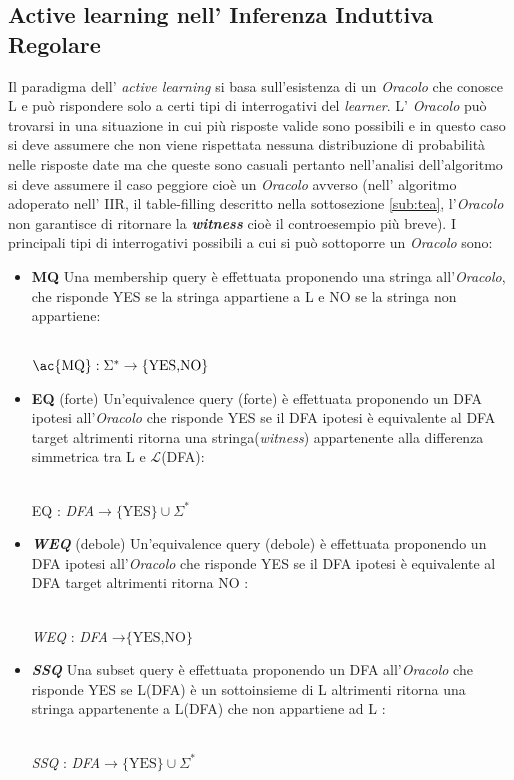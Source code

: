 \subsection{Active learning nell' Inferenza Induttiva Regolare}
Il paradigma dell' \textit{active learning} si basa sull'esistenza di un \textit{Oracolo} che conosce \ac{L} e può rispondere solo a certi tipi di interrogativi del \textit{learner}. L' \textit{Oracolo} può trovarsi in una situazione in cui più risposte valide sono possibili e in questo caso si deve assumere che non viene rispettata nessuna distribuzione di probabilità nelle risposte date ma che queste sono casuali pertanto nell'analisi dell'algoritmo si deve assumere il caso peggiore cioè un \textit{Oracolo} avverso (nell' algoritmo adoperato nell' \ac{IIR}, il table-filling descritto nella sottosezione \ref{sub:tea}, l'\textit{Oracolo} non garantisce di ritornare la \textit{\textbf{witness}} cioè il controesempio più breve).
I principali tipi di interrogativi possibili a cui si può sottoporre un \textit{Oracolo} sono:
\begin{itemize}
\item \textbf{\ac{MQ}} Una membership query è effettuata proponendo una stringa all'\textit{Oracolo}, che risponde YES se la stringa appartiene a \ac{L} e NO se la stringa non appartiene:\\\\
\centerline{$\text{\ac{MQ}} : \Sigma^{*}  \to \text{\{YES,NO\}}$}

\item \textbf{\ac{EQ}} (forte) Un'equivalence query (forte) è effettuata proponendo un DFA ipotesi all'\textit{Oracolo} che risponde YES se il DFA ipotesi è equivalente al DFA target altrimenti ritorna una stringa(\textit{witness}) appartenente alla differenza simmetrica tra \ac{L} e $\mathcal{L}$(DFA):\\\\
\centerline{\ac{EQ} : \textit{DFA}$ \to \text{\{YES\}} \cup \Sigma^{*}$}

\item \textit{\textbf{WEQ}} (debole) Un'equivalence query (debole) è effettuata proponendo un DFA ipotesi all'\textit{Oracolo} che risponde YES se il DFA ipotesi è equivalente al DFA target altrimenti ritorna NO :\\\\
\centerline{\textit{WEQ} : \textit{DFA}$ \to  \text{\{YES,NO\}}$}

\item \textit{\textbf{SSQ}} Una subset query è effettuata proponendo un DFA all'\textit{Oracolo} che risponde YES se \ac{L}(DFA) è un sottoinsieme di \ac{L} altrimenti ritorna una stringa appartenente a \ac{L}(DFA) che non appartiene ad \ac{L} :\\\\
\centerline{\textit{SSQ} : \textit{DFA}$ \to \text{\{YES\}} \cup \Sigma^{*}$}
\end{itemize}



